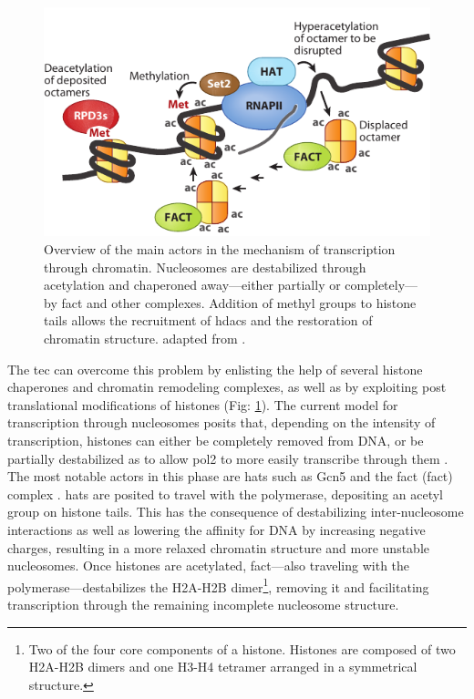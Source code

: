 \begin{figure}[ht]

\centering
\includegraphics[width=\textwidth]{figures/introduction/nucTranscription}
\caption[Mechanism of transcription through chromatin.]{Overview of the main actors in the mechanism of transcription through chromatin.
Nucleosomes are destabilized through acetylation and chaperoned away---either partially or completely---by \gls{fact} and other complexes.
Addition of methyl groups to histone tails allows the recruitment of \gls{hdacs} and the restoration of chromatin structure.
adapted from \citep{selth:2010:transcript}. }
\label{fig:nucTranscription}

\end{figure}

The \gls{tec} can overcome this problem by enlisting the help of several histone chaperones and chromatin remodeling complexes, as well as by exploiting post translational modifications of histones (Fig: \ref{fig:nucTranscription}). 
The current model for transcription through nucleosomes posits that, depending on the intensity of transcription, histones can either be completely removed from DNA, or be partially destabilized as to allow \gls{pol2} to more easily transcribe through them \citep{kulaeva:2013:mechanism}.
The most notable actors in this phase are \gls{hats} such as Gcn5 and the \gls{fact} (\glsdesc{fact}) complex \citep[For review see][]{reinberg:2006:de}. 
\gls{hats} are posited to travel with the polymerase, depositing an acetyl group on histone tails.
This has the consequence of destabilizing inter-nucleosome interactions as well as lowering the affinity for DNA by increasing negative charges, resulting in a more relaxed chromatin structure and more unstable nucleosomes.
Once histones are acetylated, \gls{fact}---also traveling with the polymerase---destabilizes the H2A-H2B dimer\footnote{Two of the four core components of a histone. Histones are composed of two H2A-H2B dimers and one H3-H4 tetramer arranged in a symmetrical structure. 
}, removing it and facilitating transcription through the remaining incomplete nucleosome structure. 

